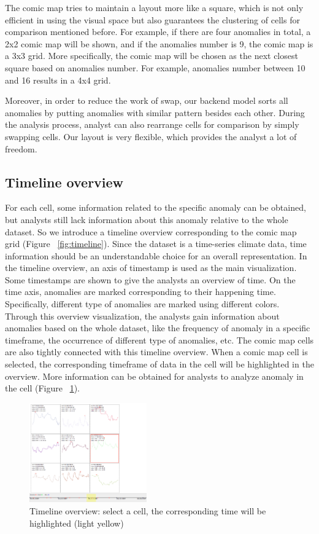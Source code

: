 \documentclass{vgtc}                          %
\begin{document}
The comic map tries to maintain a layout more like a square, which is not only efficient in using the visual space but also guarantees the clustering of cells for comparison mentioned before. For example, if there are four anomalies in total, a 2x2 comic map will be shown, and if the anomalies number is 9, the comic map is a 3x3 grid. More specifically, the comic map will be chosen as the next closest square based on anomalies number. For example, anomalies number between 10 and 16 results in a 4x4 grid.

Moreover, in order to reduce the work of swap, our backend model sorts all anomalies by putting anomalies with similar pattern besides each other. During the analysis process, analyst can also rearrange cells for comparison by simply swapping cells. Our layout is very flexible, which provides the analyst a lot of freedom.

\subsection{Timeline overview}
For each cell, some information related to the specific anomaly can be obtained, but analysts still lack information about this anomaly relative to the whole dataset. So we introduce a timeline overview corresponding to the comic map grid (Figure ~\ref{fig:timeline}). 
Since the dataset is a time-series climate data, time information should be an understandable choice for an overall representation. In the timeline overview, an axis of timestamp is used as the main visualization. Some timestamps are shown to give the analysts an overview of time. On the time axis, anomalies are marked corresponding to their happening time. Specifically, different type of anomalies are marked using different colors. Through this overview visualization, the analysts gain information about anomalies based on the whole dataset, like the frequency of anomaly in a specific timeframe, the occurrence of different type of anomalies, etc. 
The comic map cells are also tightly connected with this timeline overview. When a comic map cell is selected, the corresponding timeframe of data in the cell will be highlighted in the overview. More information can be obtained for analysts to analyze anomaly in the cell (Figure ~\ref{fig:timeline2}).

\begin{figure}[htb]
	\centering
	\includegraphics[width=0.45\textwidth]{timeline2.png}
	\caption{Timeline overview: select a cell, the corresponding time will be highlighted (light yellow)}
	\label{fig:timeline2}
\end{figure}
\end{document}
